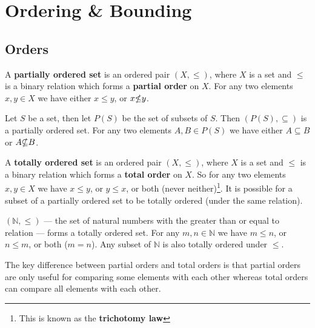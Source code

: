\documentclass[../real_analysis.tex]{subfiles}
\begin{document}
    \section{Ordering \& Bounding}\label{sec:ordering-and-bounding}
        \subsection{Orders}\label{subsec:orders}
            \begin{definition}
                A \textbf{partially ordered set} is an ordered pair $(X, \leq)$, where $X$ is a set and $\leq$ is a binary relation which forms a \textbf{partial order} on $X$. For any two elements $x, y \in X$ we have either $x \leq y$, or $x \slashed{\leq} y$.
            \end{definition}
            \begin{example}
                Let $S$ be a set, then let $P(S)$ be the set of subsets of $S$. Then $(P(S), \subseteq)$ is a partially ordered set. For any two elements $A, B \in P(S)$ we have either $A \subseteq B$ or $A \slashed{\subseteq} B$.
            \end{example}
            \begin{definition}
                A \textbf{totally ordered set} is an ordered pair $(X, \leq)$, where $X$ is a set and $\leq$ is a binary relation which forms a \textbf{total order} on $X$. So for any two elements $x, y \in X$ we have $x \leq y$, or $y \leq x$, or both (never neither)\footnote{This is known as the \textbf{trichotomy law}}. It is possible for a subset of a partially ordered set to be totally ordered (under the same relation).
            \end{definition}
            \begin{example}
                $(\mathbb{N}, \leq)$ --- the set of natural numbers with the greater than or equal to relation --- forms a totally ordered set. For any $m, n \in \mathbb{N}$ we have $m \leq n$, or $n \leq m$, or both ($m=n$). Any subset of $\mathbb{N}$ is also totally ordered under $\leq$.
            \end{example}
            The key difference between partial orders and total orders is that partial orders are only useful for comparing some elements with each other whereas total orders can compare all elements with each other.
        
\end{document}

